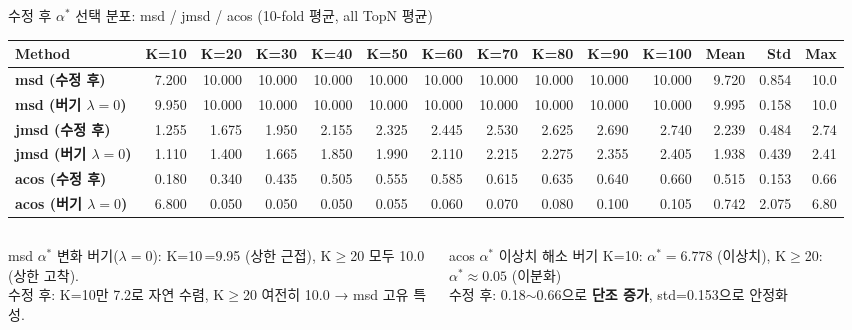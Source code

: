 \documentclass[aspectratio=169,10pt]{beamer}
\begin{document}
\begin{frame}[shrink=25]{수정 후 $\alpha^*$ 선택 분포: msd / jmsd / acos \textnormal{\small(10-fold 평균, all TopN 평균)}}
	\begin{center}
	\renewcommand{\arraystretch}{1.2}
	\small
	\begin{tabular}{l|rrrrrrrrrr|rrr}
		\toprule
		Method & K=10 & K=20 & K=30 & K=40 & K=50 & K=60 & K=70 & K=80 & K=90 & K=100 & Mean & Std & Max \\
		\midrule
		\textbf{msd (수정 후)}
		  & 7.200 & 10.000 & 10.000 & 10.000 & 10.000 & 10.000 & 10.000 & 10.000 & 10.000 & 10.000
		  & 9.720 & 0.854 & 10.0 \\
		\textbf{msd (버기 $\lambda=0$)}
		  & 9.950 & 10.000 & 10.000 & 10.000 & 10.000 & 10.000 & 10.000 & 10.000 & 10.000 & 10.000
		  & 9.995 & 0.158 & 10.0 \\
		\midrule
		\textbf{jmsd (수정 후)}
		  & 1.255 & 1.675 & 1.950 & 2.155 & 2.325 & 2.445 & 2.530 & 2.625 & 2.690 & 2.740
		  & 2.239 & 0.484 & 2.74 \\
		\textbf{jmsd (버기 $\lambda=0$)}
		  & 1.110 & 1.400 & 1.665 & 1.850 & 1.990 & 2.110 & 2.215 & 2.275 & 2.355 & 2.405
		  & 1.938 & 0.439 & 2.41 \\
		\midrule
		\textbf{acos (수정 후)}
		  & 0.180 & 0.340 & 0.435 & 0.505 & 0.555 & 0.585 & 0.615 & 0.635 & 0.640 & 0.660
		  & 0.515 & 0.153 & 0.66 \\
		\textbf{acos (버기 $\lambda=0$)}
		  & 6.800 & 0.050 & 0.050 & 0.050 & 0.055 & 0.060 & 0.070 & 0.080 & 0.100 & 0.105
		  & 0.742 & 2.075 & 6.80 \\
		\bottomrule
	\end{tabular}
	\end{center}

	\vspace{0.3em}
	\begin{columns}[T]
			\begin{block}{msd $\alpha^*$ 변화}
				\small
				버기($\lambda=0$): K=10{\,}=9.95 (상한 근접), K$\geq$20 모두 10.0 (상한 고착).\\
				수정 후: K=10만 7.2로 자연 수렴, K$\geq$20 여전히 10.0 → msd 고유 특성.
			\end{block}
			\begin{alertblock}{acos $\alpha^*$ 이상치 해소}
				버기 K=10: $\alpha^*=6.778$ (이상치), K$\geq$20: $\alpha^*\approx0.05$ (이분화) \\
				수정 후: 0.18$\sim$0.66으로 \textbf{단조 증가}, std=0.153으로 안정화
			\end{alertblock}
	\end{columns}
\end{frame}
\end{document}
